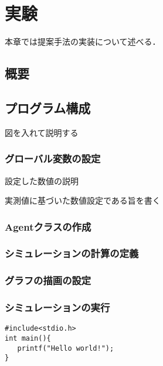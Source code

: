 \chapter{実験}
\label{implementation}

本章では提案手法の実装について述べる．

\section{概要}

\section{プログラム構成}
図を入れて説明する

\subsection{グローバル変数の設定}
設定した数値の説明

実測値に基づいた数値設定である旨を書く

\subsection{Agentクラスの作成}

\subsection{シミュレーションの計算の定義}

\subsection{グラフの描画の設定}

\subsection{シミュレーションの実行}

\begin{lstlisting}[caption=hoge,label=fuga]
#include<stdio.h>
int main(){
   printf("Hello world!");
}
\end{lstlisting}


